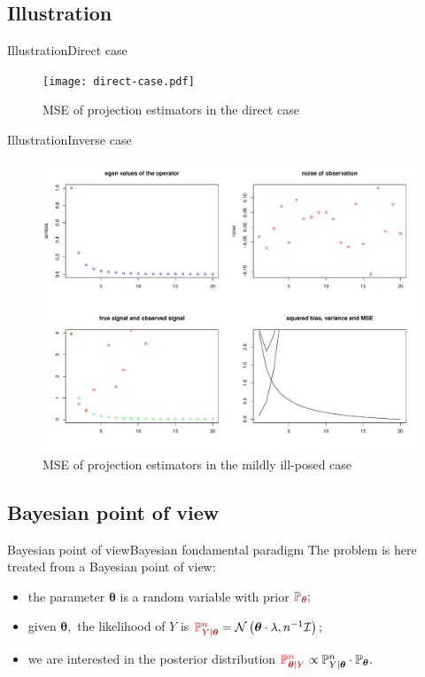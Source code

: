 \documentclass[10pt]{beamer}
\begin{document}
\subsection{Illustration}
\begin{frame}{Illustration}{Direct case}
\begin{figure}
\centering
 \texttt{[image: direct-case.pdf]}
\caption{MSE of projection estimators in the direct case}\label{DC}
\end{figure}
\end{frame}

\begin{frame}{Illustration}{Inverse case}
\begin{figure}
\centering
 \includegraphics[width=.8\linewidth]{mildly-illposed.pdf}
\caption{MSE of projection estimators in the mildly ill-posed case}\label{MIP}
\end{figure}
\end{frame}

\subsection{Bayesian point of view}
\begin{frame}{Bayesian point of view}{Bayesian fondamental paradigm}
The problem is here treated from a Bayesian point of view:

\bigskip

\begin{itemize}
\setlength\itemsep{3em}
\item<1-> the parameter $\boldsymbol{\theta}$ is a random variable with \textcolor{red!90!black}{prior} $\textcolor{red!90!black}{\mathbb{P}_{\boldsymbol{\theta}}};$
\item<2-> given $\boldsymbol{\theta},$ the \textcolor{red!90!black}{likelihood} of $Y$ is $\textcolor{red!90!black}{\mathbb{P}_{Y \vert \boldsymbol{\theta}}^{n}} = \mathcal{N}\left(\boldsymbol{\theta} \cdot \lambda, n^{-1} \mathcal{I}\right);$
\item<3-> we are interested in the \textcolor{red!90!black}{posterior distribution} $\textcolor{red!90!black}{\mathbb{P}_{\boldsymbol{\theta} \vert Y}^{n}} \propto \mathbb{P}_{Y \vert \boldsymbol{\theta}}^{n} \cdot \mathbb{P}_{\boldsymbol{\theta}}.$
\end{itemize}
\end{frame}
\end{document}

